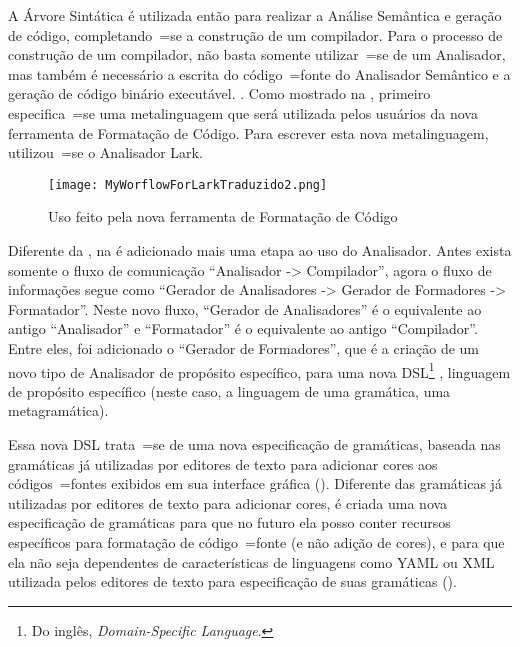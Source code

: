A Árvore Sintática é utilizada então para realizar a Análise Semântica e
geração de código,
completando~=se a construção de um compilador.
Para o processo de construção de um compilador,
não basta somente utilizar~=se de um Analisador,
mas também é necessário a escrita do código~=fonte do Analisador Semântico e
a geração de código binário executável.
.
Como mostrado na ,
primeiro especifica~=se uma metalinguagem que será utilizada pelos usuários da nova ferramenta de Formatação de Código.
Para escrever esta nova metalinguagem,
utilizou~=se o Analisador Lark.
\begin{figure}[!htb]
\caption{Uso feito pela nova ferramenta de Formatação de Código}
\label{MyWorflowForLarkTraduzido2}
\centering
\texttt{[image: MyWorflowForLarkTraduzido2.png]}
\end{figure}

Diferente da ,
na  é adicionado mais uma etapa ao uso do Analisador.
Antes exista somente o fluxo de comunicação ``Analisador -> Compilador'',
agora o fluxo de informações segue como ``Gerador de Analisadores -> Gerador de Formadores -> Formatador''.
Neste novo fluxo,
``Gerador de Analisadores'' é o equivalente ao antigo ``Analisador'' e
``Formatador'' é o equivalente ao antigo ``Compilador''.
Entre eles,
foi adicionado o ``Gerador de Formadores'',
que é a criação de um novo tipo de Analisador de propósito específico,
para uma nova DSL\footnote{
Do inglês,
\textit{Domain-Specific Language}.
} \cite{areThereDomainSpecificLanguages,yamlSpecificModelChecking},
linguagem de propósito específico (neste caso,
a linguagem de uma gramática,
uma metagramática).

Essa nova DSL trata~=se de uma nova especificação de gramáticas,
baseada nas gramáticas já utilizadas por editores de texto para adicionar cores aos códigos~=fontes exibidos em sua interface gráfica ().
Diferente das gramáticas já utilizadas por editores de texto para adicionar cores,
é criada uma nova especificação de gramáticas para que no futuro ela posso conter recursos específicos para formatação de código~=fonte (e não adição de cores),
e para que ela não seja dependentes de características de linguagens como YAML ou
XML utilizada pelos editores de texto para especificação de suas gramáticas ().

